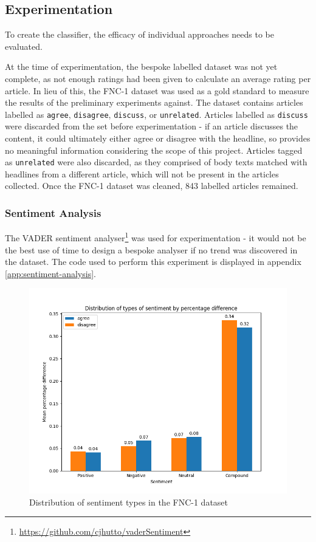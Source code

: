 \subsection{Experimentation}
To create the classifier, the efficacy of individual approaches needs to be evaluated.

At the time of experimentation, the bespoke labelled dataset was not yet complete, as not enough ratings had been given to calculate an average rating per article. In lieu of this, the FNC-1 dataset was used as a gold standard to measure the results of the preliminary experiments against. The dataset contains articles labelled as \texttt{agree}, \texttt{disagree}, \texttt{discuss}, or \texttt{unrelated}. Articles labelled as \texttt{discuss} were discarded from the set before experimentation - if an article discusses the content, it could ultimately either agree or disagree with the headline, so provides no meaningful information considering the scope of this project. Articles tagged as \texttt{unrelated} were also discarded, as they comprised of body texts matched with headlines from a different article, which will not be present in the articles collected. Once the FNC-1 dataset was cleaned, 843 labelled articles remained.

\subsubsection{Sentiment Analysis}
The VADER sentiment analyser\footnote{\url{https://github.com/cjhutto/vaderSentiment}} was used for experimentation - it would not be the best use of time to design a bespoke analyser if no trend was discovered in the dataset. The code used to perform this experiment is displayed in appendix \ref{app:sentiment-analysis}.


\begin{figure}
	\centering
	\includegraphics[width=0.8\linewidth]{images/plots/sentiment-analysis.png}
	\caption{Distribution of sentiment types in the FNC-1 dataset}\label{plot:sentiment-analysis}
\end{figure}


